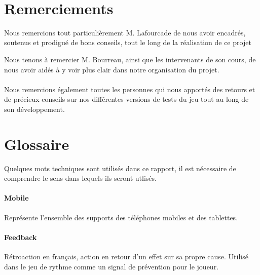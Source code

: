 \documentclass [a4 paper,11pt]{report}
\begin{document}
\newcommand{\HRule}{\rule{\linewidth}{0.5mm}}

\pagestyle{fancy}
\renewcommand\headrulewidth{1pt}
\fancyhead[L]{}
\fancyhead[R]{\leftmark}



\newpage 
~
\thispagestyle{empty}

\newpage

\thispagestyle{empty}
\section*{Remerciements}

Nous remercions tout particulièrement M. Lafourcade de nous avoir encadrés, soutenus et prodigué de bons conseils, tout le long de la réalisation de ce projet

Nous tenons à remercier M. Bourreau, ainsi que les intervenants de son cours, de nous avoir aidés à y voir plus clair dans notre organisation du projet.

\paragraph{}
Nous remercions également toutes les personnes qui nous apportés des retours et de précieux conseils sur nos différentes versions de tests du jeu tout au long de son développement.


\newpage

\setcounter{page}{1}
\tableofcontents

\newpage

\listoffigures

\newpage 



\newpage

\section*{Glossaire}

Quelques mots techniques sont utilisés dans ce rapport, il est nécessaire de comprendre le sens dans lequels ils seront utlisés.

\paragraph{Mobile} Représente l'ensemble des supports des téléphones mobiles et des tablettes.

\paragraph{Feedback} Rétroaction en français, action en retour d’un effet sur sa propre cause. Utilisé dans le jeu de rythme comme un signal de prévention pour le joueur.
\end{document}
